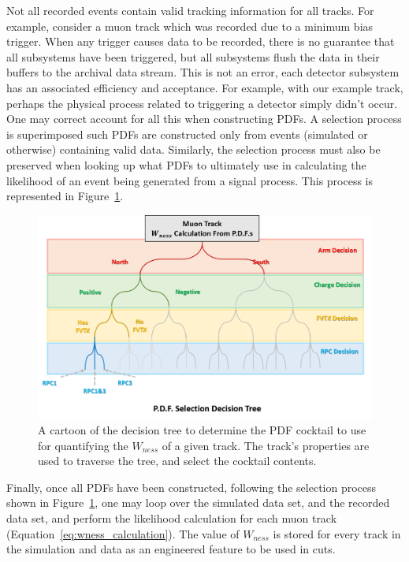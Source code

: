 Not all recorded events contain valid tracking information for all tracks. For
example, consider a muon track which was recorded due to a minimum bias trigger.
When any trigger causes data to be recorded, there is no guarantee that all
subsystems have been triggered, but all subsystems flush the data in their
buffers to the archival data stream. This is not an error, each detector
subsystem has an associated efficiency and acceptance.  For example, with our
example track, perhaps the physical process related to triggering a detector
simply didn't occur. One may correct account for all this when constructing
PDFs.  A selection process is superimposed such PDFs are constructed only from
events (simulated or otherwise) containing valid data. Similarly, the selection
process must also be preserved when looking up what PDFs to ultimately use in
calculating the likelihood of an event being generated from a signal process.
This process is represented in Figure~\ref{fig:pdf_selection_tree}.

\begin{figure}[ht]
  \centering
  \includegraphics[width=\linewidth,trim=4 70 4 4,clip]{./figures/pdf_selection_tree.png}
  \caption{
    A cartoon of the decision tree to determine the PDF cocktail to use for
    quantifying the $W_{ness}$ of a given track. The track's properties are used
    to traverse the tree, and select the cocktail contents.
  }
  \label{fig:pdf_selection_tree}
\end{figure}

Finally, once all PDFs have been constructed, following the selection process
shown in Figure~\ref{fig:pdf_selection_tree}, one may loop over the simulated
data set, and the recorded data set, and perform the likelihood calculation for
each muon track (Equation~\ref{eq:wness_calculation}). The value of
$W_{ness}$ is stored for every track in the simulation and data as an
engineered feature to be used in cuts.

